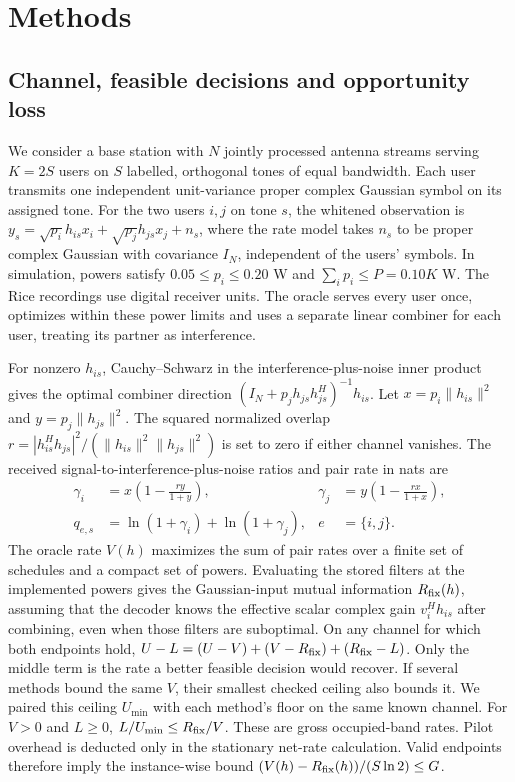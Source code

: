 \section*{Methods}
\subsection*{Channel, feasible decisions and opportunity loss}
We consider a base station with \(N\) jointly processed antenna streams serving \(K=2S\) users on \(S\) labelled, orthogonal tones of equal bandwidth. Each user transmits one independent unit-variance proper complex Gaussian symbol on its assigned tone. For the two users \(i,j\) on tone \(s\), the whitened observation is \(y_s=\sqrt{p_i}h_{is}x_i+\sqrt{p_j}h_{js}x_j+n_s\), where the rate model takes \(n_s\) to be proper complex Gaussian with covariance \(I_N\), independent of the users' symbols. In simulation, powers satisfy \(0.05\leq p_i\leq0.20\) W and \(\sum_i p_i\leq P=0.10K\) W. The Rice recordings use digital receiver units. The oracle serves every user once, optimizes within these power limits and uses a separate linear combiner for each user, treating its partner as interference.

For nonzero \(h_{is}\), Cauchy--Schwarz in the interference-plus-noise inner product gives the optimal combiner direction \((I_N+p_j h_{js}h_{js}^{H})^{-1}h_{is}\). Let \(x=p_i\|h_{is}\|^2\) and \(y=p_j\|h_{js}\|^2\). The squared normalized overlap \(r=|h_{is}^{H}h_{js}|^2/(\|h_{is}\|^2\|h_{js}\|^2)\) is set to zero if either channel vanishes. The received signal-to-interference-plus-noise ratios and pair rate in nats are
\begin{equation}
\begin{aligned}
\gamma_i &= x\left(1-\frac{r y}{1+y}\right), &
\gamma_j &= y\left(1-\frac{r x}{1+x}\right),\\
q_{e,s} &= \ln(1+\gamma_i)+\ln(1+\gamma_j), & e&=\{i,j\}.
\end{aligned}
\label{eq:sinr}
\end{equation}
The oracle rate \(V(h)\) maximizes the sum of pair rates over a finite set of schedules and a compact set of powers. Evaluating the stored filters at the implemented powers gives the Gaussian-input mutual information \(R_{\mathrm{fix}}(h)\), assuming that the decoder knows the effective scalar complex gain \(v_i^Hh_{is}\) after combining, even when those filters are suboptimal. On any channel for which both endpoints hold, \(U-L=(U-V)+(V-R_{\mathrm{fix}})+(R_{\mathrm{fix}}-L)\). Only the middle term is the rate a better feasible decision would recover. If several methods bound the same \(V\), their smallest checked ceiling also bounds it. We paired this ceiling \(U_{\min}\) with each method's floor on the same known channel. For \(V>0\) and \(L\ge0\), \(L/U_{\min}\le R_{\mathrm{fix}}/V\). These are gross occupied-band rates. Pilot overhead is deducted only in the stationary net-rate calculation. Valid endpoints therefore imply the instance-wise bound \((V(h)-R_{\mathrm{fix}}(h))/(S\ln 2)\leq G\).

